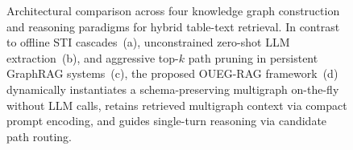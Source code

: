 \begin{figure}[t]
\centering
\resizebox{\linewidth}{!}{}
\vspace{-2mm}
\caption{Architectural comparison across four knowledge graph construction and reasoning paradigms for hybrid table-text retrieval. In contrast to offline STI cascades~(a), unconstrained zero-shot LLM extraction~(b), and aggressive top-$k$ path pruning in persistent GraphRAG systems~(c), the proposed OUEG-RAG framework~(d) dynamically instantiates a schema-preserving multigraph on-the-fly without LLM calls, retains retrieved multigraph context via compact prompt encoding, and guides single-turn reasoning via candidate path routing.}
\vspace{-2mm}
\label{fig:paradigms}
\end{figure}
